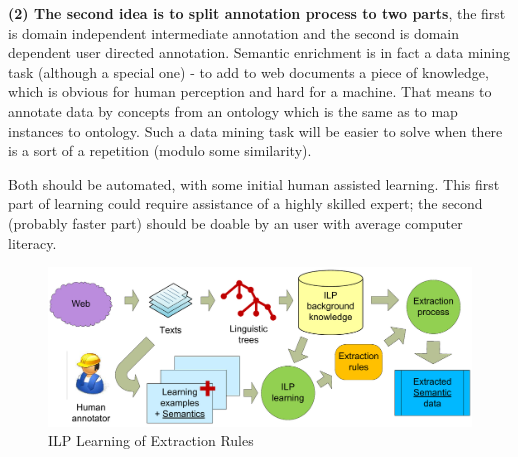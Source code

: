 \documentclass{www2009-submission}
\begin{document}




\textbf{(2) The second idea is to split annotation process to two parts}, the first is domain independent intermediate annotation and the second is domain dependent user directed annotation. Semantic enrichment is in fact a data mining task (although a special one) - to add to web documents a piece of knowledge, which is obvious for human perception and hard for a machine. That means to annotate data by concepts from an ontology which is the same as to map instances to ontology. Such a data mining task will be easier to solve when there is a sort of a repetition (modulo some similarity).\par 
Both should be automated, with some initial human assisted learning. This first part of learning could require assistance of a highly skilled expert; the second (probably faster part) should be doable by an user with average computer literacy. \par



\begin{figure}[b!]
\centering
\includegraphics[width=\hsize]{img/DedVoj_ILP}
\caption{ILP Learning of Extraction Rules}
\label{img:DedVoj_ILP}
\end{figure}
\end{document}
